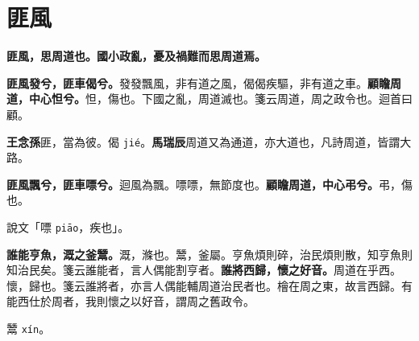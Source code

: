 \section{匪風}


\textbf{匪風，思周道也。國小政亂，憂及禍難而思周道焉。}

\textbf{匪風發兮，匪車偈兮。}{\footnotesize 發發飄風，非有道之風，偈偈疾驅，非有道之車。}\textbf{顧瞻周道，中心怛兮。}{\footnotesize 怛，傷也。下國之亂，周道滅也。箋云周道，周之政令也。迴首曰顧。}

\begin{quoting}\textbf{王念孫}匪，當為彼。偈 \texttt{jié}。\textbf{馬瑞辰}周道又為通道，亦大道也，凡詩周道，皆謂大路。\end{quoting}

\textbf{匪風飄兮，匪車嘌兮。}{\footnotesize 迴風為飄。嘌嘌，無節度也。}\textbf{顧瞻周道，中心弔兮。}{\footnotesize 弔，傷也。}

\begin{quoting}說文「嘌 \texttt{piāo}，疾也」。\end{quoting}

\textbf{誰能亨魚，溉之釜鬵。}{\footnotesize 溉，滌也。鬵，釜屬。亨魚煩則碎，治民煩則散，知亨魚則知治民矣。箋云誰能者，言人偶能割亨者。}\textbf{誰將西歸，懷之好音。}{\footnotesize 周道在乎西。懷，歸也。箋云誰將者，亦言人偶能輔周道治民者也。檜在周之東，故言西歸。有能西仕於周者，我則懷之以好音，謂周之舊政令。}

\begin{quoting}鬵 \texttt{xín}。\end{quoting}


